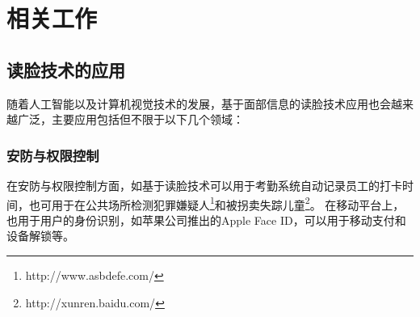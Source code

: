 \chapter{相关工作}

\section{读脸技术的应用}

随着人工智能以及计算机视觉技术的发展，基于面部信息的读脸技术应用也会越来越广泛，主要应用包括但不限于以下几个领域：

\subsection{安防与权限控制}
在安防与权限控制方面，如基于读脸技术可以用于考勤系统自动记录员工的打卡时间\cite{patel2014development}，也可用于在公共场所检测犯罪嫌疑人\footnote{http://www.asbdefe.com/}和被拐卖失踪儿童\footnote{http://xunren.baidu.com/}。
在移动平台上，也用于用户的身份识别，如苹果公司推出的Apple Face ID，可以用于移动支付和设备解锁等。

